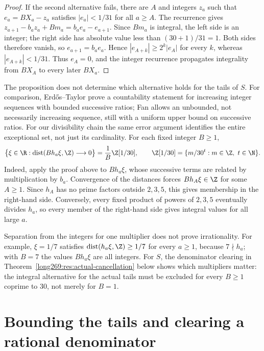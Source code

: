 \begin{proof}
If the second alternative fails, there are $A$ and integers $z_a$ such
that $e_a=BX_a-z_a$ satisfies $|e_a|<1/31$ for all $a\ge A$.
The recurrence gives
$z_{a+1}-b_az_a+Bm_a=b_ae_a-e_{a+1}$.  Since $Bm_a$ is integral, the
left side is an integer; the right side has absolute value less than
$(30+1)/31=1$.  Both sides therefore vanish, so $e_{a+1}=b_ae_a$.
Hence $|e_{A+k}|\ge2^k|e_A|$ for every $k$, whereas
$|e_{A+k}|<1/31$.  Thus $e_A=0$, and the integer recurrence propagates
integrality from $BX_A$ to every later $BX_a$.
\end{proof}

The proposition does not determine which alternative holds for the
tails of $S$.
For comparison, Erd\H{o}s--Taylor
\cite[Theorem~1, p.~600]{erdostaylor1957} prove a countability statement for
increasing integer sequences with bounded successive ratios; Fan
\cite[Lemma~3.1, arXiv v1]{fan2026strongly} allows an unbounded, not
necessarily increasing sequence, still with a uniform upper bound on
successive ratios.
For our divisibility chain the same error argument identifies the entire
exceptional set, not just its cardinality.  For each fixed integer $B\ge1$,
\[
 \bigl\{\xi\in\R:\operatorname{dist}(Bh_a\xi,\Z)\longrightarrow0\bigr\}
 =\frac1B\Z[1/30],
 \qquad
 \Z[1/30]=\{m/30^t:m\in\Z,\ t\in\N\}.
\]
Indeed, apply the proof above to $Bh_a\xi$, whose successive terms are
related by multiplication by $b_a$.  Convergence of the distances forces
$Bh_A\xi\in\Z$ for some $A\ge1$.  Since $h_A$ has no prime factors outside
$2,3,5$, this gives membership in the right-hand side.  Conversely, every
fixed product of powers of $2,3,5$ eventually divides $h_a$, so every
member of the right-hand side gives integral values for all large $a$.

Separation from the integers for one multiplier does not prove
irrationality.  For example, $\xi=1/7$ satisfies
$\operatorname{dist}(h_a\xi,\Z)\ge1/7$ for every $a\ge1$, because
$7\nmid h_a$; with $B=7$ the values $Bh_a\xi$ are all integers.
For $S$, the denominator clearing in
Theorem~\ref{long269:res:actual-cancellation} below shows which multipliers
matter: the integral alternative for the actual tails must be excluded
for every $B\ge1$ coprime to $30$, not merely for $B=1$.

\section{Bounding the tails and clearing a rational denominator}
\label{long269:sec:actual-orbit}

